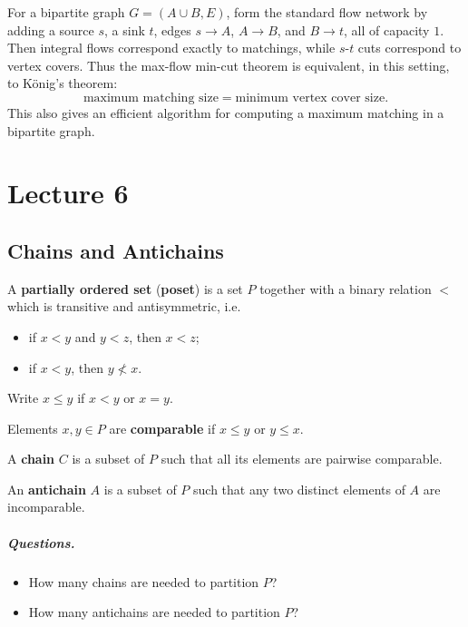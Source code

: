 \documentclass[11pt, a4paper]{ctexrep}
\begin{document}
\begin{remark}
    For a bipartite graph $G=(A\cup B,E)$, form the standard flow network by adding a source $s$, a sink $t$, edges $s\to A$, $A\to B$, and $B\to t$, all of capacity $1$. Then integral flows correspond exactly to matchings, while $s$-$t$ cuts correspond to vertex covers. Thus the max-flow min-cut theorem is equivalent, in this setting, to K\"onig's theorem:
    \[
        \text{maximum matching size}=\text{minimum vertex cover size}.
    \]
    This also gives an efficient algorithm for computing a maximum matching in a bipartite graph.
\end{remark}

\chapter{Lecture 6}

\section{Chains and Antichains}

\begin{definition}
    A \textbf{partially ordered set} (\textbf{poset}) is a set $P$ together with a binary relation $<$ which is transitive and antisymmetric, i.e.
    \begin{itemize}
        \item if $x<y$ and $y<z$, then $x<z$;
        \item if $x<y$, then $y \nless x$.
    \end{itemize}
    Write $x\leqslant y$ if $x<y$ or $x=y$.

    Elements $x,y\in P$ are \textbf{comparable} if $x\leqslant y$ or $y\leqslant x$.
\end{definition}

\begin{definition}
    A \textbf{chain} $C$ is a subset of $P$ such that all its elements are pairwise comparable.
\end{definition}

\begin{definition}
    An \textbf{antichain} $A$ is a subset of $P$ such that any two distinct elements of $A$ are incomparable.
\end{definition}

\paragraph{Questions.}
\begin{itemize}
    \item How many chains are needed to partition $P$?
    \item How many antichains are needed to partition $P$?
\end{itemize}
\end{document}
